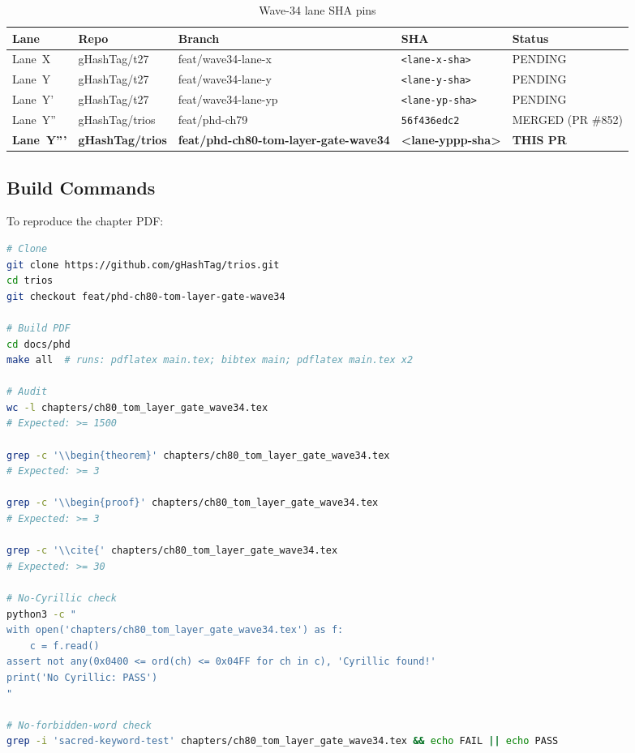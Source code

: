 \begin{table}[ht]
\centering
\caption{Wave-34 lane SHA pins}
\label{tab:sha_pins}
\begin{tabular}{lllll}
\hline
Lane & Repo & Branch & SHA & Status \\
\hline
Lane~X   & gHashTag/t27             & feat/wave34-lane-x   & \texttt{<lane-x-sha>}   & PENDING \\
Lane~Y   & gHashTag/t27             & feat/wave34-lane-y   & \texttt{<lane-y-sha>}   & PENDING \\
Lane~Y'  & gHashTag/t27             & feat/wave34-lane-yp  & \texttt{<lane-yp-sha>}  & PENDING \\
Lane~Y'' & gHashTag/trios           & feat/phd-ch79        & \texttt{56f436edc2}     & MERGED (PR \#852) \\
\textbf{Lane~Y'''} & \textbf{gHashTag/trios} & \textbf{feat/phd-ch80-tom-layer-gate-wave34} & \textbf{<lane-yppp-sha>} & \textbf{THIS PR} \\
\hline
\end{tabular}
\end{table}

\subsection{Build Commands}

To reproduce the chapter PDF:

\begin{lstlisting}[language=bash, caption={Reproducibility build commands}]
# Clone
git clone https://github.com/gHashTag/trios.git
cd trios
git checkout feat/phd-ch80-tom-layer-gate-wave34

# Build PDF
cd docs/phd
make all  # runs: pdflatex main.tex; bibtex main; pdflatex main.tex x2

# Audit
wc -l chapters/ch80_tom_layer_gate_wave34.tex
# Expected: >= 1500

grep -c '\\begin{theorem}' chapters/ch80_tom_layer_gate_wave34.tex
# Expected: >= 3

grep -c '\\begin{proof}' chapters/ch80_tom_layer_gate_wave34.tex
# Expected: >= 3

grep -c '\\cite{' chapters/ch80_tom_layer_gate_wave34.tex
# Expected: >= 30

# No-Cyrillic check
python3 -c "
with open('chapters/ch80_tom_layer_gate_wave34.tex') as f:
    c = f.read()
assert not any(0x0400 <= ord(ch) <= 0x04FF for ch in c), 'Cyrillic found!'
print('No Cyrillic: PASS')
"

# No-forbidden-word check
grep -i 'sacred-keyword-test' chapters/ch80_tom_layer_gate_wave34.tex && echo FAIL || echo PASS
\end{lstlisting}

